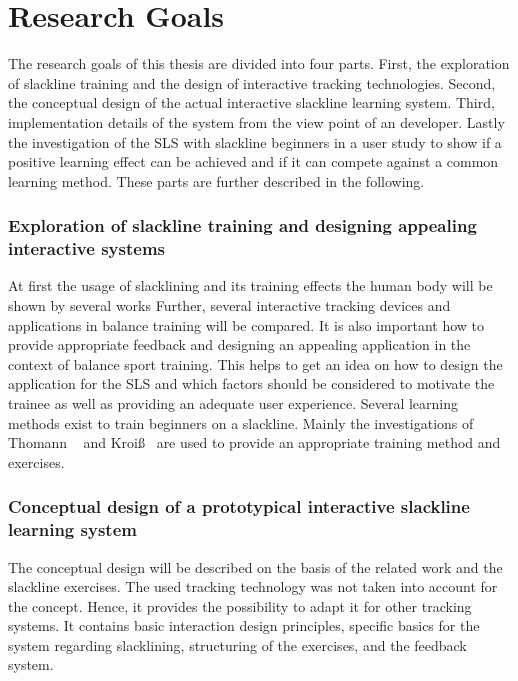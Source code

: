 \section{Research Goals}
The research goals of this thesis are divided into four parts. 
First, the exploration of slackline training and the design of interactive tracking technologies.
Second, the conceptual design of the actual interactive slackline learning system.
Third, implementation details of the system from the view point of an developer.
Lastly the investigation of the SLS with slackline beginners in a user study to show if a positive learning effect can be achieved and if it can compete against a common learning method.
These parts are further described in the following.

\subsubsection{Exploration of slackline training and designing appealing interactive systems}
At first the usage of slacklining and its training effects the human body will be shown by several works
Further, several interactive tracking devices and applications in balance training will be compared.
It is also important how to provide appropriate feedback and designing an appealing application in the context of balance sport training.
This helps to get an idea on how to design the application for the SLS and which factors should be considered to motivate the trainee as well as providing an adequate user experience.
Several learning methods exist to train beginners on a slackline.
Mainly the investigations of Thomann ~\cite{Thomann2013-aa} and Kroiß~\cite{Kroiss2007-ab} are used to provide an appropriate training method and exercises. 

\subsubsection{Conceptual design of a prototypical interactive slackline learning system}
The conceptual design will be described on the basis of the related work and the slackline exercises.
The used tracking technology was not taken into account for the concept.
Hence, it provides the possibility to adapt it for other tracking systems.
It contains basic interaction design principles, specific basics for the system regarding slacklining, structuring of the exercises, and the feedback system.

